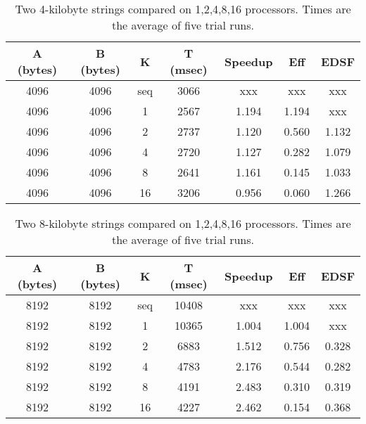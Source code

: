 \begin{table}[h]
	\begin{center}
		\begin{tabular}{ | c | c | c | c | c | c | c |}
			\hline 
			A (bytes)&	B (bytes) &	K	&	T (msec)	&	Speedup	&	Eff	&	EDSF \\
			\hline		
			4096    &	4096    &	seq	&	3066 		&	xxx		&	xxx	&	xxx \\
			4096   	&	4096   	&	1	&	2567		&1.194	&1.194&	xxx \\
			4096   	&	4096   	&	2	&	2737	 	&1.120	&0.560&1.132 \\
			4096   	&	4096   	&	4	&	2720	 	&1.127	&0.282&1.079 \\
			4096   	&	4096   	&	8	&	2641	 	&1.161	&0.145&1.033 \\
			4096   	&	4096   	&	16	&	3206	 	&0.956	&0.060&1.266 \\
			\hline
		\end{tabular}
	\end{center}
	\caption{Two 4-kilobyte strings compared on {1,2,4,8,16} processors. Times are the average of five trial runs.}
\end{table}

\begin{table}[h]
	\begin{center}
		\begin{tabular}{ | c | c | c | c | c | c | c |}
			\hline 
			A (bytes)&	B (bytes) &	K	&	T (msec)	&	Speedup	&	Eff	&	EDSF \\
			\hline		
			8192    &	8192    &	seq	&	10408	   &	xxx		&	xxx	&	xxx \\
			8192   	&	8192   	&	1	&	10365	   &	1.004&1.004&	xxx \\
			8192   	&	8192   	&	2	&	6883		&	1.512&0.756&0.328 \\
			8192   	&	8192   	&	4	&	4783		&	2.176&0.544&0.282 \\
			8192   	&	8192   	&	8	&	4191		&	2.483&0.310&0.319 \\
			8192   	&	8192   	&	16	&	4227		&	2.462&0.154&0.368 \\
			\hline
		\end{tabular}
	\end{center}
	\caption{Two 8-kilobyte strings compared on {1,2,4,8,16} processors. Times are the average of five trial runs.}
\end{table}

